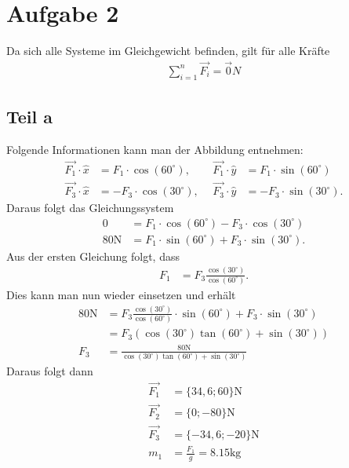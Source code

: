 \documentclass[a4paper,10pt]{extarticle}
\begin{document}
\section*{Aufgabe 2}
Da sich alle Systeme im Gleichgewicht befinden, gilt für alle Kräfte
\begin{align*}
  \sum_{i=1}^n \vec{F_i} = \vec{0}N
\end{align*}

\subsection*{Teil a}
Folgende Informationen kann man der Abbildung entnehmen:
\begin{align*}
  \vec{F_1}\cdot\hat{x} &= F_1\cdot\cos(60^{\circ}), ~~& 
  \vec{F_1}\cdot\hat{y} &= F_1\cdot\sin(60^{\circ}) \\
  \vec{F_3}\cdot\hat{x} &= -F_3\cdot\cos(30^{\circ}), ~~& 
  \vec{F_3}\cdot\hat{y} &= -F_3\cdot\sin(30^{\circ}) \mbox{.}
\end{align*}
Daraus folgt das Gleichungssystem
\begin{align*}
  0          &= F_1\cdot\cos(60^{\circ}) - F_3\cdot\cos(30^{\circ})\\
  80\mbox{N} &= F_1\cdot\sin(60^{\circ}) + F_3\cdot\sin(30^{\circ}) \mbox{.}
\end{align*}
Aus der ersten Gleichung folgt, dass 
\begin{align*}
  F_1 &= F_3 \frac{\cos(30^{\circ})}{\cos(60^{\circ})} \mbox{.}
\end{align*}
Dies kann man nun wieder einsetzen und erhält
\begin{align*}
  80\mbox{N} &= F_3 \frac{\cos(30^{\circ})}{\cos(60^{\circ})}\cdot\sin(60^{\circ}) + F_3\cdot\sin(30^{\circ}) \\
  &= F_3 (\cos(30^{\circ})\tan(60^{\circ}) + \sin(30^{\circ})) \\
  F_3 &= \frac{80\mbox{N}}{\cos(30^{\circ})\tan(60^{\circ}) + \sin(30^{\circ})}
\end{align*}
Daraus folgt dann
\begin{align*}
  \vec{F_1} &= \{34,6; 60\}\mbox{N}\\
  \vec{F_2} &= \{0; -80\}\mbox{N}\\
  \vec{F_3} &= \{-34,6; -20\}\mbox{N}\\
  m_1 &= \frac{F_1}{g} = 8.15\mbox{kg}
\end{align*}
\end{document}
